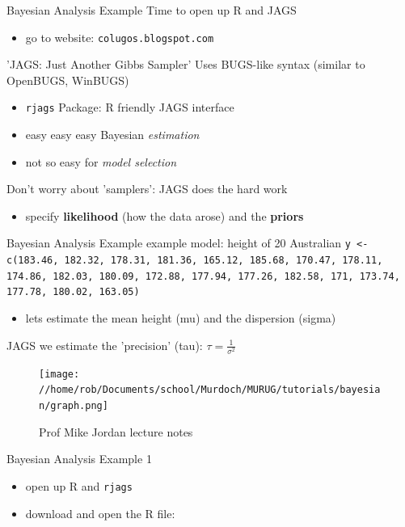 \documentclass[presentation,9pt,xcolor=dvipsnames]{beamer}
\begin{document}
\begin{frame}[fragile,label={sec:org2f972b2}]{Bayesian Analysis Example}
 Time to open up R and JAGS
\begin{itemize}
\item go to website: \texttt{colugos.blogspot.com}
\end{itemize}
\begin{block}{'JAGS: Just Another Gibbs Sampler'}
Uses BUGS-like syntax (similar to OpenBUGS, WinBUGS)
\begin{itemize}
\item \texttt{rjags} Package: R friendly JAGS interface
\item easy easy \alert{easy} Bayesian \emph{estimation}
\item not so easy for \emph{model selection}
\end{itemize}
Don't worry about 'samplers': JAGS does the hard work
\begin{itemize}
\item specify \textbf{likelihood} (how the data arose) and the \textbf{priors}
\end{itemize}
\end{block}
\end{frame}
\begin{frame}[fragile,label={sec:org6cd0f35}]{Bayesian Analysis Example}
 example model: height of 20 Australian
\color{blue}
\texttt{y <- c(183.46, 182.32, 178.31, 181.36, 165.12, 185.68, 170.47, 178.11, 174.86, 182.03, 180.09, 172.88, 177.94, 177.26, 182.58, 171, 173.74, 177.78, 180.02, 163.05)}
\color{black}
\begin{itemize}
\item lets estimate the mean height (mu) and the dispersion (sigma)
\end{itemize}
\begin{small}
JAGS we estimate the 'precision' (tau): $\tau=\frac{1}{\sigma^2}$
\end{small}
\begin{figure}[htbp]

\texttt{[image: //home/rob/Documents/school/Murdoch/MURUG/tutorials/bayesian/graph.png]}
\caption{Prof Mike Jordan lecture notes}
\end{figure}
\end{frame}

\begin{frame}[fragile,label={sec:org26f2a3f}]{Bayesian Analysis Example 1}
 \begin{itemize}
\item open up R and \texttt{rjags}
\item download and open the R file:
\end{itemize}
\end{frame}
\end{document}
